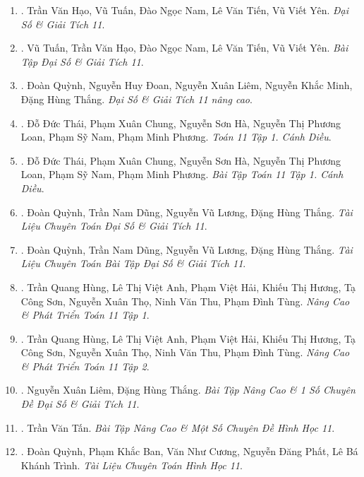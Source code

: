\documentclass{article}
\begin{document}
\begin{enumerate}
	\item \cite{SGK_Toan_11_dai_so_giai_tich_co_ban}. {\sc Trần Văn Hạo, Vũ Tuấn, Đào Ngọc Nam, Lê Văn Tiến, Vũ Viết Yên}. {\it Đại Số \& Giải Tích 11}.

	\item \cite{SBT_Toan_11_dai_so_giai_tich_co_ban}. {\sc Vũ Tuấn, Trần Văn Hạo, Đào Ngọc Nam, Lê Văn Tiến, Vũ Viết Yên}. {\it Bài Tập Đại Số \& Giải Tích 11}.

	\item \cite{SGK_Toan_11_dai_so_giai_tich_nang_cao}. {\sc Đoàn Quỳnh, Nguyễn Huy Đoan, Nguyễn Xuân Liêm, Nguyễn Khắc Minh, Đặng Hùng Thắng}. {\it Đại Số \& Giải Tích 11 nâng cao}.

	\item \cite{SGK_Toan_11_CD_tap_1}. {\sc Đỗ Đức Thái, Phạm Xuân Chung, Nguyễn Sơn Hà, Nguyễn Thị Phương Loan, Phạm Sỹ Nam, Phạm Minh Phương}. {\it Toán 11 Tập 1. Cánh Diều}.

	\item \cite{SBT_Toan_11_CD_tap_2}. {\sc Đỗ Đức Thái, Phạm Xuân Chung, Nguyễn Sơn Hà, Nguyễn Thị Phương Loan, Phạm Sỹ Nam, Phạm Minh Phương}. {\it Bài Tập Toán 11 Tập 1. Cánh Diều}.

	\item \cite{TLCT_dai_so_giai_tich_11}. {\sc Đoàn Quỳnh, Trần Nam Dũng, Nguyễn Vũ Lương, Đặng Hùng Thắng}. {\it Tài Liệu Chuyên Toán Đại Số \& Giải Tích 11}.

	\item \cite{TLCT_BT_dai_so_giai_tich_11}. {\sc Đoàn Quỳnh, Trần Nam Dũng, Nguyễn Vũ Lương, Đặng Hùng Thắng}. {\it Tài Liệu Chuyên Toán Bài Tập Đại Số \& Giải Tích 11}.

	\item \cite{Hung_nang_cao_phat_trien_Toan_11_tap_1}. Trần Quang Hùng, Lê Thị Việt Anh, Phạm Việt Hải, Khiếu Thị Hương, Tạ Công Sơn, Nguyễn Xuân Thọ, Ninh Văn Thu, Phạm Đình Tùng. {\it Nâng Cao \& Phát Triển Toán 11 Tập 1}.\hfill{\sf[reading]}

	\item \cite{Hung_nang_cao_phat_trien_Toan_11_tap_2}. Trần Quang Hùng, Lê Thị Việt Anh, Phạm Việt Hải, Khiếu Thị Hương, Tạ Công Sơn, Nguyễn Xuân Thọ, Ninh Văn Thu, Phạm Đình Tùng. {\it Nâng Cao \& Phát Triển Toán 11 Tập 2}.\hfill{\sf[reading]}

	\item \cite{Liem_Thang2020}. Nguyễn Xuân Liêm, Đặng Hùng Thắng. {\it Bài Tập Nâng Cao \& 1 Số Chuyên Đề Đại Số \& Giải Tích 11}.\hfill{\sf[reading]}

	\item \cite{Tan2017}. Trần Văn Tấn. {\it Bài Tập Nâng Cao \& Một Số Chuyên Đề Hình Học 11}.\hfill{\sf[reading]}

	\item \cite{TLCT_hinh_hoc_11}. Đoàn Quỳnh, Phạm Khắc Ban, Văn Như Cương, Nguyễn Đăng Phất, Lê Bá Khánh Trình. {\it Tài Liệu Chuyên Toán Hình Học 11}.\hfill{\sf[reading]}
\end{enumerate}
\end{document}
